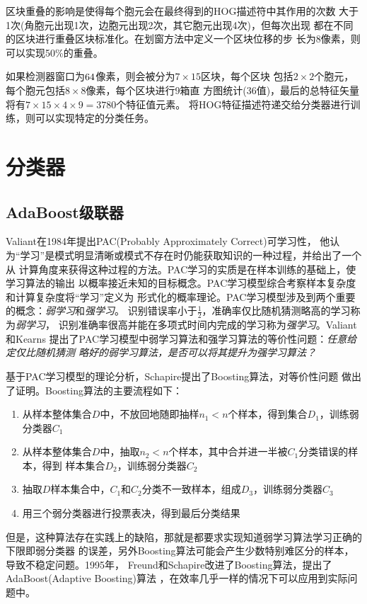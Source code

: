 区块重叠的影响是使得每个胞元会在最终得到的HOG描述符中其作用的次数
大于1次(角胞元出现1次，边胞元出现2次，其它胞元出现4次)，但每次出现
都在不同的区块进行重叠区块标准化。在划窗方法中定义一个区块位移的步
长为8像素，则可以实现50\%的重叠。

如果检测器窗口为$64\time128$像素，则会被分为$7\times15$区块，每个区块
包括$2\times2$个胞元，每个胞元包括$8\times8$像素，每个区块进行9箱直
方图统计(36值)，最后的总特征矢量将有$7\times15\times4\times9=3780$个特征值元素。
将HOG特征描述符递交给分类器进行训练，则可以实现特定的分类任务。
\section{分类器}
\subsection{AdaBoost级联器}
Valiant在1984年提出PAC(Probably Approximately Correct)可学习性，
他认为``学习''是模式明显清晰或模式不存在时仍能获取知识的一种过程，并给出了一个从
计算角度来获得这种过程的方法。PAC学习的实质是在样本训练的基础上，使学习算法的输出
以概率接近未知的目标概念。PAC学习模型综合考察样本复杂度和计算复杂度将``学习''定义为
形式化的概率理论。PAC学习模型涉及到两个重要的概念：\textit{弱学习}和\textit{强学习}。
识别错误率小于$\frac{1}{2}$，准确率仅比随机猜测略高的学习称为\textit{弱学习}，
识别准确率很高并能在多项式时间内完成的学习称为\textit{强学习}。Valiant和Kearns
提出了PAC学习模型中弱学习算法和强学习算法的等价性问题：\textit{任意给定仅比随机猜测
略好的弱学习算法，是否可以将其提升为强学习算法？}

基于PAC学习模型的理论分析，Schapire提出了Boosting算法\cite{boosting}，对等价性问题
做出了证明。Boosting算法的主要流程如下：
\begin{enumerate}
\item 从样本整体集合$D$中，不放回地随即抽样$n_1<n$个样本，得到集合$D_1$，训练弱分类器$C_1$
\item 从样本整体集合$D$中，抽取$n_2<n$个样本，其中合并进一半被$C_1$分类错误的样本，得到
    样本集合$D_2$，训练弱分类器$C_2$
\item 抽取$D$样本集合中，$C_1$和$C_2$分类不一致样本，组成$D_3$，训练弱分类器$C_3$
\item 用三个弱分类器进行投票表决，得到最后分类结果
\end{enumerate}

但是，这种算法存在实践上的缺陷，那就是都要求实现知道弱学习算法学习正确的下限即弱分类器
的误差，另外Boosting算法可能会产生少数特别难区分的样本，导致不稳定问题。1995年，
Freund和Schapire改进了Boosting算法，提出了AdaBoost(Adaptive Boosting)算法\cite{adaboost}
，在效率几乎一样的情况下可以应用到实际问题中。

